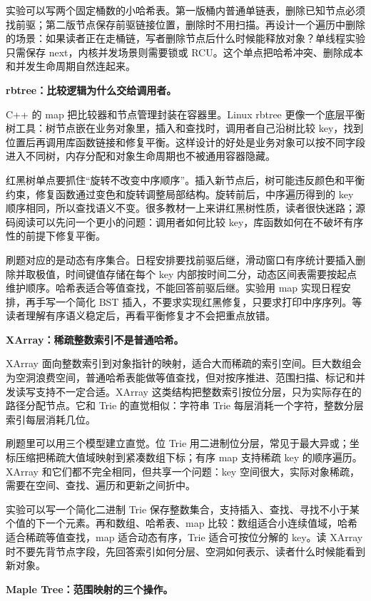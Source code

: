 实验可以写两个固定桶数的小哈希表。第一版桶内普通单链表，删除已知节点必须找前驱；第二版节点保存前驱链接位置，删除时不用扫描。再设计一个遍历中删除的场景：如果读者正在走桶链，写者删除节点后什么时候能释放对象？单线程实验只需保存 next，内核并发场景则需要锁或 RCU。这个单点把哈希冲突、删除成本和并发生命周期自然连起来。

\noindent\textbf{rbtree：比较逻辑为什么交给调用者。}

C++ 的 map 把比较器和节点管理封装在容器里。Linux rbtree 更像一个底层平衡树工具：树节点嵌在业务对象里，插入和查找时，调用者自己沿树比较 key，找到位置后再调用库函数链接和修复平衡。这样设计的好处是业务对象可以按不同字段进入不同树，内存分配和对象生命周期也不被通用容器隐藏。

红黑树单点要抓住“旋转不改变中序顺序”。插入新节点后，树可能违反颜色和平衡约束，修复函数通过变色和旋转调整局部结构。旋转前后，中序遍历得到的 key 顺序相同，所以查找语义不变。很多教材一上来讲红黑树性质，读者很快迷路；源码阅读可以先问一个更小的问题：调用者如何比较 key，库函数如何在不破坏有序性的前提下修复平衡。

刷题对应的是动态有序集合。日程安排要找前驱后继，滑动窗口有序统计要插入删除并取极值，时间键值存储在每个 key 内部按时间二分，动态区间表需要按起点维护顺序。哈希表适合等值查找，不能回答前驱后继。实验用 map 实现日程安排，再手写一个简化 BST 插入，不要求实现红黑修复，只要求打印中序序列。等读者理解有序语义稳定后，再看平衡修复才不会把重点放错。

\noindent\textbf{XArray：稀疏整数索引不是普通哈希。}

XArray 面向整数索引到对象指针的映射，适合大而稀疏的索引空间。巨大数组会为空洞浪费空间，普通哈希表能做等值查找，但对按序推进、范围扫描、标记和并发读写支持不一定合适。XArray 这类结构把整数索引按位分层，只为实际存在的路径分配节点。它和 Trie 的直觉相似：字符串 Trie 每层消耗一个字符，整数分层索引每层消耗几位。

刷题里可以用三个模型建立直觉。位 Trie 用二进制位分层，常见于最大异或；坐标压缩把稀疏大值域映射到紧凑数组下标；有序 map 支持稀疏 key 的顺序遍历。XArray 和它们都不完全相同，但共享一个问题：key 空间很大，实际对象稀疏，需要在空间、查找、遍历和更新之间折中。

实验可以写一个简化二进制 Trie 保存整数集合，支持插入、查找、寻找不小于某个值的下一个元素。再和数组、哈希表、map 比较：数组适合小连续值域，哈希适合稀疏等值查找，map 适合动态有序，Trie 适合可按位分解的 key。读 XArray 时不要先背节点字段，先回答索引如何分层、空洞如何表示、读者什么时候能看到新对象。

\noindent\textbf{Maple Tree：范围映射的三个操作。}


